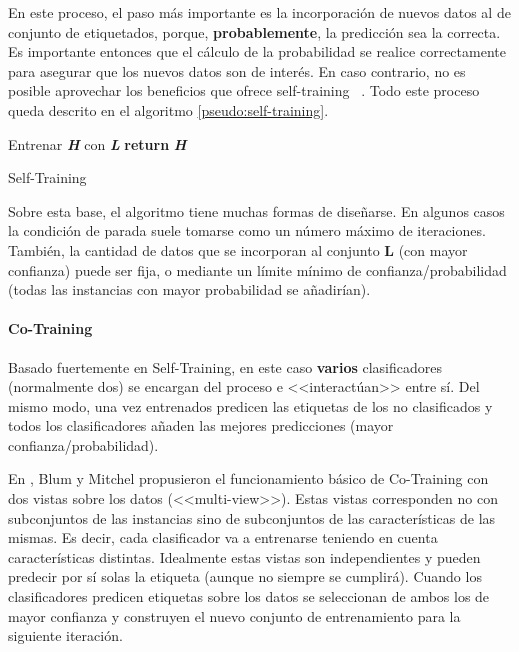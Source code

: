 En este proceso, el paso más importante es la incorporación de nuevos datos al
de conjunto de etiquetados, porque, \textbf{probablemente}, la predicción sea la
correcta. Es importante entonces que el cálculo de la probabilidad se realice
correctamente para asegurar que los nuevos datos son de interés. En caso
contrario, no es posible aprovechar los beneficios que ofrece self-training~
\cite{vanEngelen2020}. Todo este proceso queda descrito en el algoritmo
\ref{pseudo:self-training}.

\begin{algorithm}
    \DontPrintSemicolon
     Entrenar \textbf{\textit{H}} con \textbf{\textit{L}}\;
     \textbf{return} \textbf{\textit{H}}
     \caption{Self-Training}\label{pseudo:self-training}
\end{algorithm}

Sobre esta base, el algoritmo tiene muchas formas de diseñarse. En algunos casos
la condición de parada suele tomarse como un número máximo de iteraciones.
También, la cantidad de datos que se incorporan al conjunto \textbf{L} (con
mayor confianza) puede ser fija, o mediante un límite mínimo de
confianza/probabilidad (todas las instancias con mayor probabilidad se
añadirían).

\paragraph{Co-Training}
Basado fuertemente en Self-Training, en este caso \textbf{varios} clasificadores
(normalmente dos) se encargan del proceso e <<interactúan>> entre sí. Del mismo
modo, una vez entrenados predicen las etiquetas de los no clasificados y todos
los clasificadores añaden las mejores predicciones (mayor
confianza/probabilidad).

En \cite{blum1998combining}, Blum y Mitchel propusieron el funcionamiento básico
de Co-Training con dos vistas sobre los datos (<<multi-view>>). Estas vistas
corresponden no con subconjuntos de las instancias sino de subconjuntos de las
características de las mismas. Es decir, cada clasificador va a entrenarse
teniendo en cuenta características distintas. Idealmente estas vistas son
independientes y pueden predecir por sí solas la etiqueta (aunque no siempre se
cumplirá). Cuando los clasificadores predicen etiquetas sobre los datos se
seleccionan de ambos los de mayor confianza y construyen el nuevo conjunto de
entrenamiento para la siguiente iteración.


